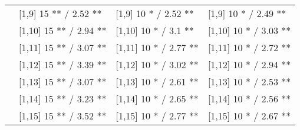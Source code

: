 \begin{table}
\begin{tabular}[t]{llll}
 & {}[1,9] 15 ** / 2.52 ** & {}[1,9] 10 * / 2.52 ** & {}[1,9] 10 * / 2.49 **\\
 & {}[1,10] 15 ** / 2.94 ** & {}[1,10] 10 * / 3.1 ** & {}[1,10] 10 * / 3.03 **\\
 & {}[1,11] 15 ** / 3.07 ** & {}[1,11] 10 * / 2.77 ** & {}[1,11] 10 * / 2.72 **\\
 & {}[1,12] 15 ** / 3.39 ** & {}[1,12] 10 * / 3.02 ** & {}[1,12] 10 * / 2.94 **\\
\addlinespace
 & {}[1,13] 15 ** / 3.07 ** & {}[1,13] 10 * / 2.61 ** & {}[1,13] 10 * / 2.53 **\\
 & {}[1,14] 15 ** / 3.23 ** & {}[1,14] 10 * / 2.65 ** & {}[1,14] 10 * / 2.56 **\\
 & {}[1,15] 15 ** / 3.52 ** & {}[1,15] 10 * / 2.77 ** & {}[1,15] 10 * / 2.67 **\\
\bottomrule
\end{tabular}
\end{table}
